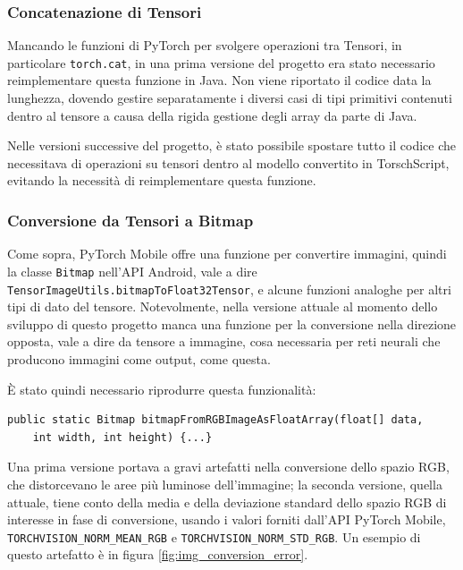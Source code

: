 \subsubsection*{Concatenazione di Tensori}

Mancando le funzioni di PyTorch per svolgere operazioni tra Tensori, in particolare
\texttt{torch.cat}, in una prima versione del progetto era stato necessario reimplementare
questa funzione in Java. Non viene riportato il codice data la lunghezza, dovendo gestire 
separatamente i diversi casi di tipi primitivi contenuti dentro al tensore a causa della rigida
gestione degli array da parte di Java.

Nelle versioni successive del progetto, è stato possibile spostare tutto il codice che
necessitava di operazioni su tensori dentro al modello convertito in TorschScript, evitando
la necessità di reimplementare questa funzione.

\subsubsection*{Conversione da Tensori a Bitmap}

Come sopra, PyTorch Mobile offre una funzione per convertire immagini, quindi la classe
\texttt{Bitmap} nell'API Android, vale a dire \texttt{TensorImageUtils.bitmapToFloat32Tensor},
e alcune funzioni analoghe per altri tipi di dato del tensore. Notevolmente, nella versione 
attuale al momento dello sviluppo di questo progetto manca una funzione per la conversione
nella direzione opposta, vale a dire da tensore a immagine, cosa necessaria per reti neurali
che producono immagini come output, come questa.

È stato quindi necessario riprodurre questa funzionalità:

\begin{lstlisting}
public static Bitmap bitmapFromRGBImageAsFloatArray(float[] data, 
    int width, int height) {...}
\end{lstlisting}

Una prima versione portava a gravi artefatti nella conversione dello spazio RGB, che 
distorcevano le aree più luminose dell'immagine; la seconda versione, quella attuale, 
tiene conto della media e della deviazione standard dello spazio RGB di interesse in fase di
conversione, usando i valori forniti dall'API PyTorch Mobile, 
\texttt{TORCHVISION\_NORM\_MEAN\_RGB} e \texttt{TORCHVISION\_NORM\_STD\_RGB}. Un esempio di 
questo artefatto è in figura \ref{fig:img_conversion_error}.

